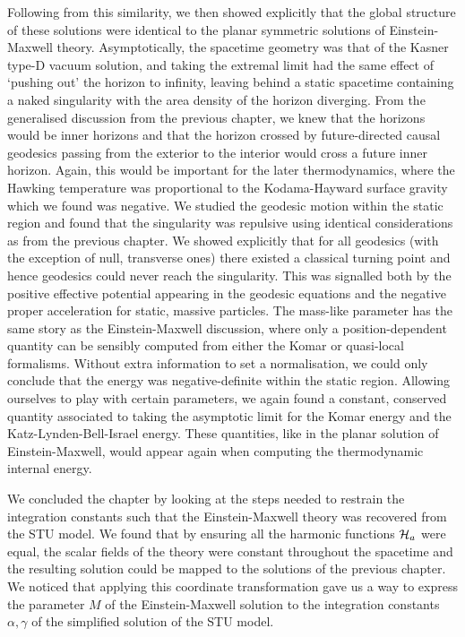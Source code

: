 Following from this similarity, we then showed explicitly that the global structure of these solutions were identical to the planar symmetric solutions of Einstein-Maxwell theory. Asymptotically, the spacetime geometry was that of the Kasner type-D vacuum solution, and taking the extremal limit had the same effect of `pushing out' the horizon to infinity, leaving behind a static spacetime containing a naked singularity with the area density of the horizon diverging. From the generalised discussion from the previous chapter, we knew that the horizons would be inner horizons and that the horizon crossed by future-directed causal geodesics passing from the exterior to the interior would cross a future inner horizon. Again, this would be important for the later thermodynamics, where the Hawking temperature was proportional to the Kodama-Hayward surface gravity which we found was negative. We studied the geodesic motion within the static region and found that the singularity was repulsive using identical considerations as from the previous chapter. We showed explicitly that for all geodesics (with the exception of null, transverse ones) there existed a classical turning point and hence geodesics could never reach the singularity. This was signalled both by the positive effective potential appearing in the geodesic equations and the negative proper acceleration for static, massive particles. The mass-like parameter has the same story as the Einstein-Maxwell discussion, where only a position-dependent quantity can be sensibly computed from either the Komar or quasi-local formalisms. Without extra information to set a normalisation, we could only conclude that the energy was negative-definite within the static region. Allowing ourselves to play with certain parameters, we again found a constant, conserved quantity associated to taking the asymptotic limit for the Komar energy and the Katz-Lynden-Bell-Israel energy. These quantities, like in the planar solution of Einstein-Maxwell, would appear again when computing the thermodynamic internal energy.

We concluded the chapter by looking at the steps needed to restrain the integration constants such that the Einstein-Maxwell theory was recovered from the STU model. We found that by ensuring all the harmonic functions ${\cal H}_a$ were equal, the scalar fields of the theory were constant throughout the spacetime and the resulting solution could be mapped to the solutions of the previous chapter. We noticed that applying this coordinate transformation gave us a way to express the parameter $M$ of the Einstein-Maxwell solution to the integration constants $\alpha, \gamma$ of the simplified solution of the STU model. 

